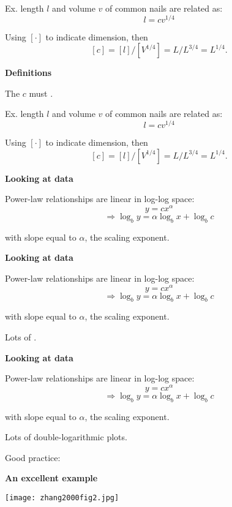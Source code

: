 Ex. length $l$ and volume $v$ of common nails
are related as:\
$$l = c v^{1/4}$$

\inv

Using $[ \cdot ]$ to indicate dimension, then 
$$[c] = [l]/[V^{1/4}] = L/L^{3/4} = L^{1/4}.$$


  \textbf{Definitions}

The  $c$ must .

Ex. length $l$ and volume $v$ of common nails
are related as:\
$$l = c v^{1/4}$$

Using $[ \cdot ]$ to indicate dimension, then 
$$[c] = [l]/[V^{1/4}] = L/L^{3/4} = L^{1/4}.$$


  \textbf{Looking at data}

Power-law relationships
are linear in log-log space:
$$y = c x^\alpha $$
$$ \Rightarrow \log_{b} y = \alpha \log_{b} x + \log_{b} c$$

with slope equal to $\alpha$, the scaling exponent.




  \textbf{Looking at data}

Power-law relationships
are linear in log-log space:
$$y = c x^\alpha $$
$$ \Rightarrow \log_{b} y = \alpha \log_{b} x + \log_{b} c$$

with slope equal to $\alpha$, the scaling exponent.

 Lots of .



  \textbf{Looking at data}

Power-law relationships
are linear in log-log space:
$$y = c x^\alpha $$
$$ \Rightarrow \log_{b} y = \alpha \log_{b} x + \log_{b} c$$

with slope equal to $\alpha$, the scaling exponent.

 Lots of double-logarithmic plots.

\ding{43} Good practice: 


  \textbf{An excellent example}

\texttt{[image: zhang2000fig2.jpg]}  

